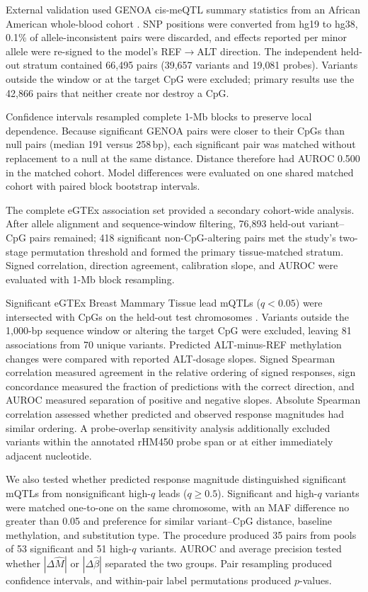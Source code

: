 \documentclass[10pt,letterpaper,twocolumn]{article}
\begin{document}
{\color{addedred}

External validation used GENOA cis-meQTL summary statistics from an African
American whole-blood cohort \cite{shang2023genoa}. SNP positions were converted
from hg19 to hg38, 0.1\% of allele-inconsistent pairs were discarded, and effects
reported per minor allele \cite{gemma2012} were re-signed to the model's
REF$\rightarrow$ALT direction. The independent held-out stratum contained
66{,}495 pairs (39{,}657 variants and 19{,}081 probes). Variants outside the
window or at the target CpG were excluded; primary results use the 42{,}866 pairs
that neither create nor destroy a CpG.

\label{sec:stats}

Confidence intervals resampled complete 1-Mb blocks to preserve local dependence.
Because significant GENOA pairs were closer to their CpGs than null pairs
(median 191 versus 258\,bp), each significant pair was matched without
replacement to a null at the same distance. Distance therefore had AUROC 0.500
in the matched cohort. Model differences were evaluated on one shared matched
cohort with paired block bootstrap intervals.

The complete eGTEx association set provided a secondary cohort-wide analysis.
After allele alignment and sequence-window filtering, 76{,}893 held-out
variant--CpG pairs remained; 418 significant non-CpG-altering pairs met the
study's two-stage permutation threshold and formed the primary tissue-matched
stratum. Signed correlation, direction agreement, calibration slope, and AUROC
were evaluated with 1-Mb block resampling.

Significant eGTEx Breast Mammary Tissue lead mQTLs ($q<0.05$) were intersected
with CpGs on the held-out test chromosomes \cite{oliva2023mqtl}. Variants outside
the 1,000-bp sequence window or altering the target CpG were excluded, leaving 81
associations from 70 unique variants. Predicted ALT-minus-REF methylation changes
were compared with reported ALT-dosage slopes. Signed Spearman correlation
measured agreement in the relative ordering of signed responses, sign concordance
measured the fraction of predictions with the correct direction, and AUROC
measured separation of positive and negative slopes. Absolute Spearman
correlation assessed whether predicted and observed response magnitudes had
similar ordering. A probe-overlap sensitivity analysis additionally excluded
variants within the annotated rHM450 probe span or at either immediately
adjacent nucleotide.

We also tested whether predicted response magnitude distinguished significant
mQTLs from nonsignificant high-$q$ leads ($q\geq0.5$). Significant and high-$q$
variants were matched one-to-one on the same chromosome, with an MAF difference
no greater than 0.05 and preference for similar variant--CpG distance, baseline
methylation, and substitution type. The procedure produced 35 pairs from pools
of 53 significant and 51 high-$q$ variants. AUROC and average precision tested
whether $|\Delta\widehat M|$ or $|\Delta\widehat\beta|$ separated the two groups.
Pair resampling produced confidence intervals, and within-pair label
permutations produced $p$-values.
}
\end{document}
